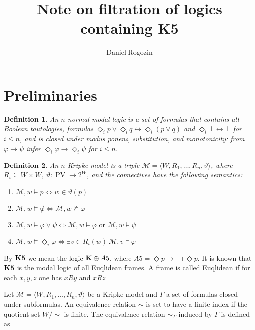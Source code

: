 \documentclass[a4paper]{article}
\author{Daniel Rogozin}
\date{}
\title{Note on filtration of logics containing {\bf K5}}
\theoremstyle{defin}
\newtheorem{defin}{Definition}
\theoremstyle{theorem}
\theoremstyle{prop}
\theoremstyle{lemma}
\theoremstyle{ex}
\theoremstyle{col}
\begin{document}
\maketitle

\nocite{*}

\section{Preliminaries}

\begin{defin}
  An $n$-normal modal logic is a set of formulas that contains all Boolean tautologies, formulas $\Diamond_i p \lor \Diamond_i q \leftrightarrow \Diamond_i (p \lor q)$ and $\Diamond_i \bot \leftrightarrow \bot$ for $i \leq n$, and is closed under modus ponens, substitution, and monotonicity: from $\varphi \rightarrow \psi$ infer $\Diamond_i \varphi \rightarrow \Diamond_i \psi$ for $i \leq n$.
\end{defin}

\begin{defin} An $n$-Kripke model is a triple $\mathcal{M} = \langle W, R_1, \dots, R_n, \vartheta \rangle$, where $R_i \subseteq W \times W$, $\vartheta : \operatorname{PV} \to 2^W$, and the connectives have the following semantics:

  \begin{enumerate}
    \item $\mathcal{M}, w \models p \Leftrightarrow w \in \vartheta(p)$
    \item $\mathcal{M}, w \models \not \varphi \Leftrightarrow \mathcal{M}, w \nvDash \varphi$
    \item $\mathcal{M}, w \models \varphi \lor \psi \Leftrightarrow \mathcal{M}, w \models \varphi \text{ or } \mathcal{M}, w \models \psi$
    \item $\mathcal{M}, w \models \Diamond_i \varphi \Leftrightarrow \exists v \in R_i(w) \: \mathcal{M}, v \models \varphi$
  \end{enumerate}
\end{defin}

By ${\bf K5}$ we mean the logic ${\bf K} \oplus {A5}$, where ${A5} = \Diamond p \to \Box \Diamond p$. It is known that ${\bf K5}$ is the modal logic of all Euqlidean frames. A frame is called Euqlidean if for each $x, y, z$ one has $x R y$ and $x R z$

Let $\mathcal{M} = \langle W, R_1, \dots, R_n, \vartheta \rangle$ be a Kripke model and $\Gamma$ a set of formulas closed under subformulas. An equivalence relation $\sim$ is set to have a finite index if the quotient set $W / \sim$ is finite. The equivalence relation $\sim_{\Gamma}$ induced by $\Gamma$ is defined as
\end{document}

